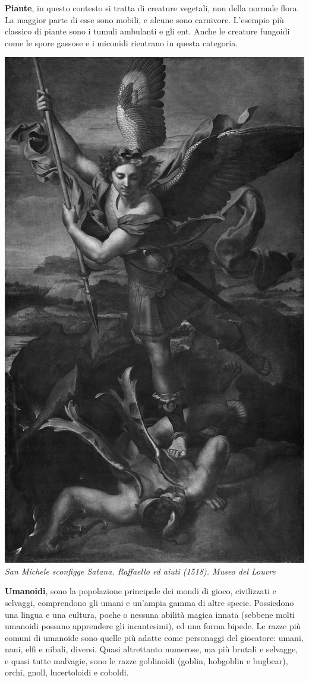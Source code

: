 \begin{multicols}{2}
\smallskip\textbf{Piante}, in questo contesto si tratta di creature vegetali, non della normale flora. La maggior parte di esse sono mobili, e alcune sono carnivore. L'esempio più classico di piante sono i tumuli ambulanti e gli ent. Anche le creature fungoidi come le spore gassose e i miconidi rientrano in questa categoria.

\begin{center}
\includegraphics[width=0.60\linewidth]{immagini/sanmichelesatana.png}\\
\textit{San Michele sconfigge Satana. Raffaello ed aiuti (1518). Museo del Louvre}
\end{center}

\smallskip\textbf{Umanoidi}, sono la popolazione principale dei mondi di gioco, civilizzati e selvaggi, comprendono gli umani e un'ampia gamma di altre specie. Possiedono una lingua e una cultura, poche o nessuna abilità magica innata (sebbene molti umanoidi possano apprendere gli incantesimi), ed una forma bipede. Le razze più comuni di umanoide sono quelle più adatte come personaggi del giocatore: umani, nani, elfi e nibali, diversi. Quasi altrettanto numerose, ma più brutali e selvagge, e quasi tutte malvagie, sono le razze goblinoidi (goblin, hobgoblin e bugbear), orchi, gnoll, lucertoloidi e coboldi.\\


\end{multicols}
